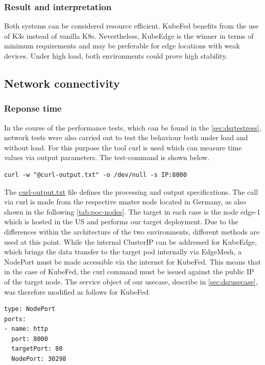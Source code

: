 \documentclass[MSC,Master,english]{twbook}%
\begin{document}
\subsubsection{Result and interpretation} 
Both systems can be considered resource efficient. KubeFed benefits from the use of K3s instead of vanilla K8s. Nevertheless, KubeEdge is the winner in terms of minimum requirements and may be preferable for edge locations with weak devices. Under high load, both environments could prove high stability.

\subsection{Network connectivity}
\label{sec:dsrtestnetwork}
\subsubsection{Reponse time}
In the course of the performance tests, which can be found in the \autoref{sec:dsrtestress}, network tests were also carried out to test the behaviour both under load and without load. For this purpose the tool curl is used which can measure time values via output parameters. The test-command is shown below.

\begin{lstlisting}[caption={Curl command},captionpos=b]
curl -w "@curl-output.txt" -o /dev/null -s IP:8000
\end{lstlisting}

The \hyperref{https://github.com/Berndinox/K8sEdge/blob/main/Tests/network/curl.md}{}{}{curl-output.txt} file defines the processing and output specifications. The call via curl is made from the respective master node located in Germany, as also shown in the following \autoref{tab:poc-nodes}. The target in each case is the node edge-1 which is hosted in the US and performs our target deployment. Due to the differences within the architecture of the two environments, different methods are used at this point. While the internal ClusterIP can be addressed for KubeEdge, which brings the data transfer to the target pod internally via EdgeMesh, a NodePort must be made accessible via the internet for KubeFed. This means that in the case of KubeFed, the curl command must be issued against the public IP of the target node. The service object of our usecase, describe in \autoref{sec:dsrusecase}, was therefore modified as follows for KubeFed.

\begin{lstlisting}[caption={Curl command},captionpos=b]
type: NodePort
ports:
- name: http
  port: 8000
  targetPort: 80
  NodePort: 30298
\end{lstlisting}
\end{document}
